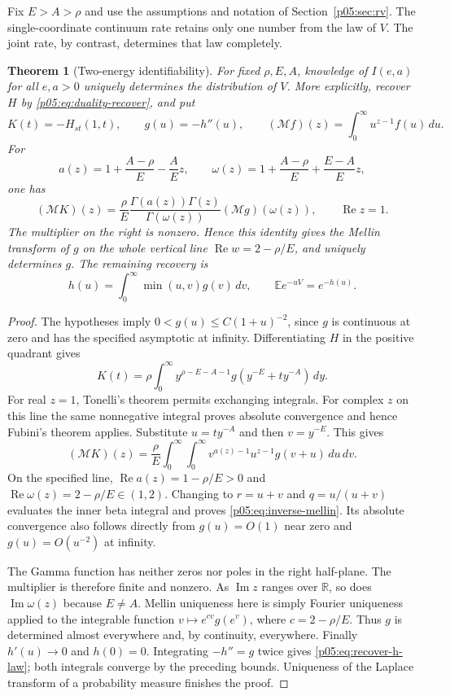 \documentclass[11pt,letterpaper]{article}
\newtheorem{theorem}{Theorem}[section]
\theoremstyle{definition}
\theoremstyle{remark}
\renewcommand{\Re}{\operatorname{Re}}
\renewcommand{\Im}{\operatorname{Im}}
\newcommand{\1}{\mathbf 1}
\begin{document}
Fix $E>A>\rho$ and use the assumptions and notation of
Section~\ref{p05:sec:rv}. The single-coordinate continuum rate retains only
one number from the law of $V$. The joint rate, by contrast, determines
that law completely.

\begin{theorem}[Two-energy identifiability]\label{p05:thm:two-energy-inverse}
For fixed $\rho,E,A$, knowledge of $I(e,a)$ for all $e,a>0$ uniquely
determines the distribution of $V$. More explicitly, recover $H$ by
\eqref{p05:eq:duality-recover}, and put
\[
 K(t)=-H_{st}(1,t),\qquad g(u)=-h''(u),\qquad
 (\mathcal Mf)(z)=\int_0^\infty u^{z-1}f(u)\,du.
\]
For
\[
 a(z)=1+\frac{A-\rho}{E}-\frac{A}{E}z,
 \qquad \omega(z)=1+\frac{A-\rho}{E}+\frac{E-A}{E}z,
\]
one has
\begin{equation}\label{p05:eq:inverse-mellin}
 (\mathcal MK)(z)=\frac{\rho}{E}
 \frac{\Gamma(a(z))\Gamma(z)}{\Gamma(\omega(z))}
 (\mathcal Mg)(\omega(z)),\qquad \Re z=1.
\end{equation}
The multiplier on the right is nonzero. Hence this identity gives the
Mellin transform of $g$ on the whole vertical line
$\Re w=2-\rho/E$, and uniquely determines $g$. The remaining recovery is
\begin{equation}\label{p05:eq:recover-h-law}
 h(u)=\int_0^\infty\min(u,v)g(v)\,dv,
 \qquad \mathbb E e^{-uV}=e^{-h(u)}.
\end{equation}
\end{theorem}

\begin{proof}
The hypotheses imply
$0<g(u)\le C(1+u)^{-2}$, since $g$ is continuous at zero and has the
specified asymptotic at infinity. Differentiating $H$ in the positive
quadrant gives
\[
 K(t)=\rho\int_0^\infty
 y^{\rho-E-A-1}g(y^{-E}+t y^{-A})\,dy.
\]
For real $z=1$, Tonelli's theorem permits exchanging integrals.
For complex $z$ on this line the same nonnegative integral proves
absolute convergence and hence Fubini's theorem applies. Substitute
$u=t y^{-A}$ and then $v=y^{-E}$. This gives
\[
 (\mathcal MK)(z)
 =\frac{\rho}{E}\int_0^\infty\int_0^\infty
 v^{a(z)-1}u^{z-1}g(v+u)\,du\,dv.
\]
On the specified line,
$\Re a(z)=1-\rho/E>0$ and
$\Re\omega(z)=2-\rho/E\in(1,2)$.
Changing to $r=u+v$ and $q=u/(u+v)$ evaluates the inner beta integral
and proves \eqref{p05:eq:inverse-mellin}. Its absolute convergence also
follows directly from $g(u)=O(1)$ near zero and $g(u)=O(u^{-2})$ at
infinity.

The Gamma function has neither zeros nor poles in the right
half-plane. The multiplier is therefore finite and nonzero. As
$\Im z$ ranges over $\mathbb R$, so does
$\Im\omega(z)$ because $E\ne A$. Mellin uniqueness here is simply
Fourier uniqueness applied to the integrable function
$v\mapsto e^{cv}g(e^v)$, where $c=2-\rho/E$.
Thus $g$ is determined almost everywhere and, by continuity, everywhere.
Finally $h'(u)\to0$ and $h(0)=0$. Integrating $-h''=g$ twice gives
\eqref{p05:eq:recover-h-law}; both integrals converge by the preceding
bounds. Uniqueness of the Laplace transform of a probability measure
finishes the proof.
\end{proof}
\end{document}
